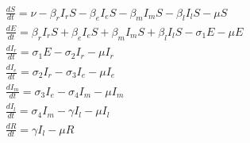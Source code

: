 \begin{align*}
&\frac{dS}{dt}= \nu - \beta_r I_r S- \beta_e I_e S- \beta_m I_m S- \beta_l I_l S - \mu S \\
&\frac{dE}{dt}= \beta_r I_r S+ \beta_e I_e S+ \beta_m I_m S+ \beta_l I_l S - \sigma_{1} E - \mu E\\
&\frac{dI_r}{dt}= \sigma_{1} E - \sigma_{2} I_r - \mu I_r\\
&\frac{dI_e}{dt}= \sigma_{2} I_r - \sigma_{3} I_e - \mu I_e\\
&\frac{dI_m}{dt}= \sigma_{3} I_e - \sigma_{4} I_m - \mu I_m\\
&\frac{dI_l}{dt}= \sigma_{4} I_m - \gamma I_l - \mu I_l\\
&\frac{dR}{dt}= \gamma I_l - \mu R\\
\end{align*}